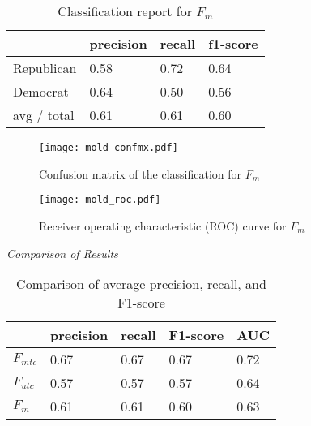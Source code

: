 \documentclass[10pt,11pt,12pt,oneside]{book}
\begin{document}

\newpage
\vspace{0.5cm}
\begin{table}[H]
	\begin{tabular}{ | p{5cm} || p{3cm} | p{3cm} | p{3cm} |}
		\hline
		& precision & recall & f1-score\\
		\hline
		Republican & 0.58 & 0.72 & 0.64\\
		\hline
		Democrat & 0.64 & 0.50 & 0.56\\  
		\hline
		avg / total  & 0.61 & 0.61 & 0.60 \\
		\hline
	\end{tabular}
	\caption{Classification report for $ F_{m} $}
	\label{cr_mold}
\end{table}

\begin{figure}[H]
	\begin{center}
		\texttt{[image: mold\_confmx.pdf]}\\
		\caption{Confusion matrix of the classification for $ F_{m} $}
	\end{center}
\end{figure}

\begin{figure}[H]
	\begin{center}
		\texttt{[image: mold\_roc.pdf]}\\
		\caption{Receiver operating characteristic (ROC) curve for $ F_{m} $}
	\end{center}
\end{figure}
\clearpage
\newpage
\vspace*{0.2cm}
\textit{Comparison of Results}\\

\begin{table}[H]
	\begin{tabular}{ | p{5cm} || p{2.25cm} | p{2.25cm} | p{2.25cm} | p{2.25cm} |}
		\hline
		& precision & recall & F1-score & AUC\\
		\hline
		$ F_{mtc} $ & 0.67 & 0.67 & 0.67 & 0.72\\
		\hline
		$ F_{utc} $ & 0.57 & 0.57 & 0.57 & 0.64\\  
		\hline
		$ F_{m} $  & 0.61 & 0.61 & 0.60 & 0.63\\
		\hline
	\end{tabular}
	\caption{Comparison of average precision, recall, and F1-score}
	\label{cr_mold}
\end{table}
\end{document}
